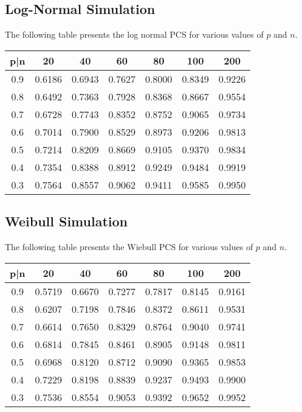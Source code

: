 \documentclass[twoside]{article}
\begin{document}
\begin{multicols}{2}
\subsection{Log-Normal Simulation}
The following table presents the log normal PCS for various values of $p$ and $n$.
\begin{tabular}{|c|c|c|c|c|c|c|}
p|n & 20 & 40 & 60 & 80 & 100 & 200 \\ \hline 
0.9 & 0.6186 & 0.6943 & 0.7627 & 0.8000 & 0.8349 & 0.9226 \\
0.8 & 0.6492 & 0.7363 & 0.7928 & 0.8368 & 0.8667 & 0.9554 \\
0.7 & 0.6728 & 0.7743 & 0.8352 & 0.8752 & 0.9065 & 0.9734 \\
0.6 & 0.7014 & 0.7900 & 0.8529 & 0.8973 & 0.9206 & 0.9813    \\                                             
0.5 & 0.7214 & 0.8209 & 0.8669 & 0.9105 & 0.9370 &  0.9834 \\                                                 
0.4 & 0.7354 & 0.8388 & 0.8912 & 0.9249 & 0.9484 & 0.9919 \\                                                
0.3 & 0.7564 & 0.8557 & 0.9062 & 0.9411 & 0.9585 & 0.9950 \\ \hline
\end{tabular}
\subsection{Weibull Simulation}
The following table presents the Wiebull PCS for various values of $p$ and $n$.
\begin{tabular}{|c|c|c|c|c|c|c|}
p|n & 20 & 40 & 60 & 80 & 100 & 200 \\ \hline 
0.9 & 0.5719 & 0.6670 & 0.7277 & 0.7817 & 0.8145 & 0.9161 \\
0.8 & 0.6207 & 0.7198 & 0.7846 & 0.8372 & 0.8611 & 0.9531 \\
0.7 & 0.6614 & 0.7650 & 0.8329 & 0.8764 & 0.9040 & 0.9741 \\
0.6 & 0.6814 & 0.7845 & 0.8461 & 0.8905 & 0.9148 & 0.9811 \\
0.5 & 0.6968 & 0.8120 & 0.8712 & 0.9090 & 0.9365 & 0.9853 \\
0.4 & 0.7229 & 0.8198 & 0.8839 & 0.9237 & 0.9493 & 0.9900 \\
0.3 & 0.7536 & 0.8554 & 0.9053 & 0.9392 & 0.9652 & 0.9952 \\
\hline
\end{tabular}

\end{multicols}
\end{document}
